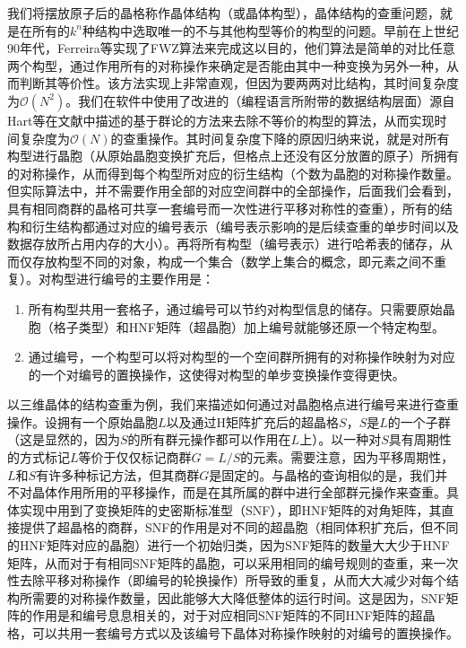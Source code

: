 我们将摆放原子后的晶格称作晶体结构（或晶体构型），晶体结构的查重问题，就是在所有的$k^n$种结构中选取唯一的不与其他构型等价的构型的问题。早前在上世纪90年代，Ferreira等\cite{ferreira1991stability}实现了FWZ算法来完成这以目的，他们算法是简单的对比任意两个构型，通过作用所有的对称操作来确定是否能由其中一种变换为另外一种，从而判断其等价性。该方法实现上非常直观，但因为要两两对比结构，其时间复杂度为$\mathcal{O}(N^2)$。我们在软件中使用了改进的（编程语言所附带的数据结构层面）源自Hart等在文献\cite{hart2008algorithm}中描述的基于群论的方法来去除不等价的构型的算法，从而实现时间复杂度为$\mathcal{O}(N)$的查重操作。其时间复杂度下降的原因归纳来说，就是对所有构型进行晶胞（从原始晶胞变换扩充后，但格点上还没有区分放置的原子）所拥有的对称操作，从而得到每个构型所对应的衍生结构（个数为晶胞的对称操作数量。但实际算法中，并不需要作用全部的对应空间群中的全部操作，后面我们会看到，具有相同商群的晶格可共享一套编号而一次性进行平移对称性的查重），所有的结构和衍生结构都通过对应的编号表示（编号表示影响的是后续查重的单步时间以及数据存放所占用内存的大小）。再将所有构型（编号表示）进行哈希表的储存，从而仅存放构型不同的对象，构成一个集合（数学上集合的概念，即元素之间不重复）。对构型进行编号的主要作用是：
\begin{enumerate}
  \item 所有构型共用一套格子，通过编号可以节约对构型信息的储存。只需要原始晶胞（格子类型）和HNF矩阵（超晶胞）加上编号就能够还原一个特定构型。
  \item 通过编号，一个构型可以将对构型的一个空间群所拥有的对称操作映射为对应的一个对编号的置换操作，这使得对构型的单步变换操作变得更快。
\end{enumerate}

以三维晶体的结构查重为例，我们来描述如何通过对晶胞格点进行编号来进行查重操作。设拥有一个原始晶胞$L$以及通过H矩阵扩充后的超晶格$S$，$S$是$L$的一个子群（这是显然的，因为$S$的所有群元操作都可以作用在$L$上）。以一种对$S$具有周期性的方式标记$L$等价于仅仅标记商群$G=L/S$的元素。需要注意，因为平移周期性，$L$和$S$有许多种标记方法，但其商群$G$是固定的。与晶格的查询相似的是，我们并不对晶体作用所用的平移操作，而是在其所属的群中进行全部群元操作来查重。具体实现中用到了变换矩阵的史密斯标准型（SNF），即HNF矩阵的对角矩阵，其直接提供了超晶格的商群，SNF的作用是对不同的超晶胞（相同体积扩充后，但不同的HNF矩阵对应的晶胞）进行一个初始归类，因为SNF矩阵的数量大大少于HNF矩阵，从而对于有相同SNF矩阵的晶胞，可以采用相同的编号规则的查重，来一次性去除平移对称操作（即编号的轮换操作）所导致的重复，从而大大减少对每个结构所需要的对称操作数量，因此能够大大降低整体的运行时间。这是因为，SNF矩阵的作用是和编号息息相关的，对于对应相同SNF矩阵的不同HNF矩阵的超晶格，可以共用一套编号方式以及该编号下晶体对称操作映射的对编号的置换操作。

